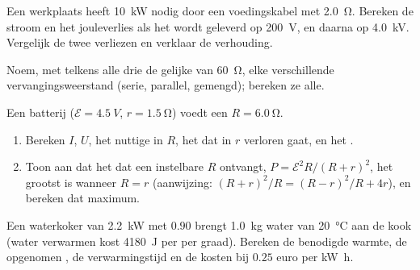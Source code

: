 \begin{exercise}[$\star\star$]\label{exo:g11:circuits-and-power:11}
Een werkplaats heeft \qty{10}{kW} nodig door een voedingskabel met
 \qty{2.0}{\ohm}. Bereken de stroom en het jouleverlies als het
 wordt geleverd op \qty{200}{V}, en daarna op \qty{4.0}{kV}.
Vergelijk de twee verliezen en verklaar de verhouding.
\end{exercise}

\begin{exercise}[$\star\star\star$]\label{exo:g11:circuits-and-power:12}
Noem, met telkens alle drie de gelijke  van \qty{60}{\ohm},
elke verschillende vervangingsweerstand (serie, parallel, gemengd);
bereken ze alle.
\end{exercise}

\begin{exercise}[$\star\star\star$]\label{exo:g11:circuits-and-power:13}
Een batterij ($\mathcal{E} = \qty{4.5}{V}$, $r = \qty{1.5}{\ohm}$) voedt
een  $R = \qty{6.0}{\ohm}$.
\begin{enumerate}
  \item Bereken $I$, $U$, het nuttige  in $R$, het  dat
        in $r$ verloren gaat, en het .
  \item Toon aan dat het  dat een instelbare $R$ ontvangt,
        $P = \mathcal{E}^2 R/(R+r)^2$, het grootst is wanneer $R = r$
        (aanwijzing: $(R+r)^2/R = (R-r)^2/R + 4r$), en bereken dat
        maximum.
\end{enumerate}
\end{exercise}

\begin{exercise}[$\star\star\star$]\label{exo:g11:circuits-and-power:14}
Een waterkoker van \qty{2.2}{kW} met  $0.90$ brengt
\qty{1.0}{kg} water van \qty{20}{\degreeCelsius} aan de kook (water
verwarmen kost \qty{4180}{J} per  per graad). Bereken de
benodigde warmte, de opgenomen , de verwarmingstijd en
de kosten bij $0.25$ euro per \unit{kW.h}.
\end{exercise}

